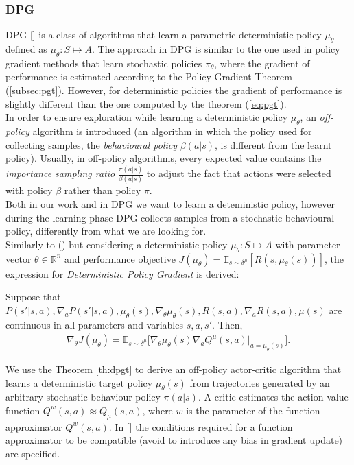 \subsubsection{\ac{DPG}} \label{subsec:dpg}
\acf{DPG} [\citet{article}] is a class of algorithms that learn a parametric deterministic policy $\mu_{\theta}$ defined as $\mu_{\theta}: S \mapsto A$. The approach in \ac{DPG} is similar to the one used in policy gradient methods that learn stochastic policies $\pi_{\theta}$, where the gradient of performance is estimated according to the Policy Gradient Theorem (\ref{subsec:pgt}). However, for deterministic policies the gradient of performance is slightly different than the one computed by the theorem (\ref{eq:pgt}).\\
\newline
In order to ensure exploration while learning a deterministic policy $\mu_{\theta}$, an \emph{off-policy} algorithm is introduced (\ie an algorithm in which the policy used for collecting samples, the \emph{behavioural policy} $\beta(a|s)$, is different from the learnt policy). Usually, in off-policy algorithms, every expected value contains the \emph{importance sampling ratio} $\frac{\pi(a|s)}{\beta(a|s)}$ to adjust the fact that actions were selected with policy $\beta$ rather than policy $\pi$.\\
\newline
Both in our work and in \ac{DPG} we want to learn a deteministic policy, however during the learning phase \ac{DPG} collects samples from a stochastic behavioural policy, differently from what we are looking for.\\
\newline
Similarly to () but considering a deterministic policy $\mu_{\theta}: S \mapsto A$ with parameter vector $\theta \in \mathbb{R}^n$ and performance objective $J(\mu_{\theta}) = \mathbb{E}_{s \sim \delta^{\mu}}[R(s, \mu_{\theta}(s))]$, the expression for \emph{Deterministic Policy Gradient} is derived:
\begin{theorem} \label{th:dpgt}
	Suppose that $P(s'|s,a), \nabla_aP(s'|s,a), \mu_{\theta}(s), \nabla_{\theta} \mu_{\theta}(s), R(s,a), \nabla_a R(s,a), \mu(s)$  are continuous in all parameters and variables $s, a, s'$. Then, 
	\begin{align}
	\nabla_{\theta}J(\mu_{\theta}) = \mathbb{E}_{s \sim \delta^{\mu}} \Big[\nabla_{\theta} \mu_{\theta} (s) \nabla_a Q^{\mu}(s,a)|_{a = \mu_{\theta} (s)}\Big].
	\end{align}
\end{theorem}
\noindent We use the Theorem \ref{th:dpgt} to derive an off-policy actor-critic algorithm that learns a deterministic target policy $\mu_{\theta}(s)$ from trajectories generated by an arbitrary stochastic behaviour policy $\pi(a|s)$. A critic estimates the action-value function $Q^w(s,a) \approx Q_{\mu}(s,a)$, where $w$ is the parameter of the function approximator $Q^w(s,a)$. In [\citet{article}] the conditions required for a function approximator to be compatible (\ie avoid to introduce any bias in gradient update) are specified.

